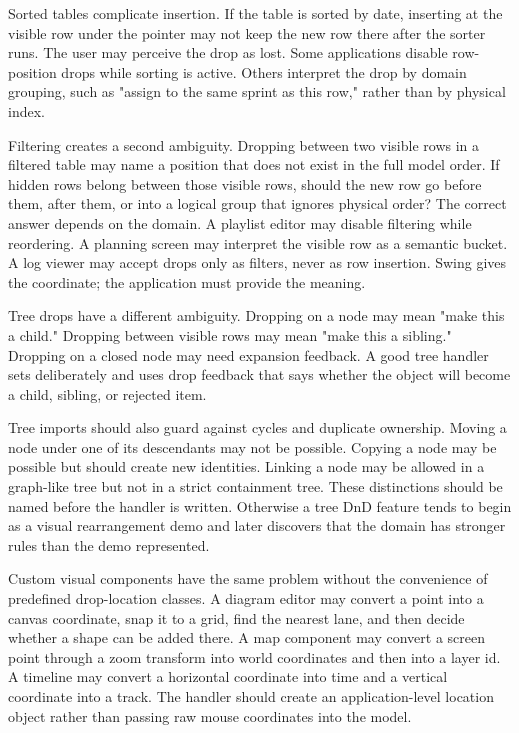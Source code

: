 Sorted tables complicate insertion. If the table is sorted by date, inserting at the visible row under the pointer may not keep the new row there after the sorter runs. The user may perceive the drop as lost. Some applications disable row-position drops while sorting is active. Others interpret the drop by domain grouping, such as "assign to the same sprint as this row," rather than by physical index.

Filtering creates a second ambiguity. Dropping between two visible rows in a filtered table may name a position that does not exist in the full model order. If hidden rows belong between those visible rows, should the new row go before them, after them, or into a logical group that ignores physical order? The correct answer depends on the domain. A playlist editor may disable filtering while reordering. A planning screen may interpret the visible row as a semantic bucket. A log viewer may accept drops only as filters, never as row insertion. Swing gives the coordinate; the application must provide the meaning.

Tree drops have a different ambiguity. Dropping on a node may mean "make this a child." Dropping between visible rows may mean "make this a sibling." Dropping on a closed node may need expansion feedback. A good tree handler sets  deliberately and uses drop feedback that says whether the object will become a child, sibling, or rejected item.

Tree imports should also guard against cycles and duplicate ownership. Moving a node under one of its descendants may not be possible. Copying a node may be possible but should create new identities. Linking a node may be allowed in a graph-like tree but not in a strict containment tree. These distinctions should be named before the handler is written. Otherwise a tree DnD feature tends to begin as a visual rearrangement demo and later discovers that the domain has stronger rules than the demo represented.

Custom visual components have the same problem without the convenience of predefined drop-location classes. A diagram editor may convert a point into a canvas coordinate, snap it to a grid, find the nearest lane, and then decide whether a shape can be added there. A map component may convert a screen point through a zoom transform into world coordinates and then into a layer id. A timeline may convert a horizontal coordinate into time and a vertical coordinate into a track. The handler should create an application-level location object rather than passing raw mouse coordinates into the model.

